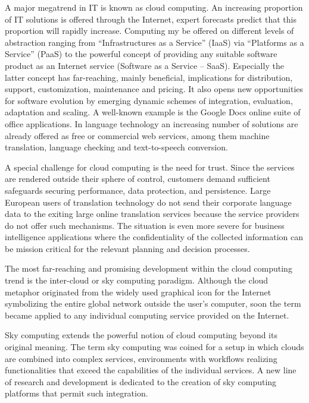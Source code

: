 \documentclass[10pt, plain]{../../metanetpaper}
\begin{document}
\begin{multicols}{2}
A major megatrend in IT is known as cloud computing.  An increasing proportion of IT solutions is offered through the Internet, expert forecasts predict that this proportion will rapidly increase.  Computing my be offered on different levels of abstraction ranging from “Infrastructures as a Service” (IaaS) via “Platforms as a Service” (PaaS) to the powerful concept of providing any suitable software product as an Internet service (Software as a Service – SaaS). Especially the latter concept has far-reaching, mainly beneficial, implications for distribution, support, customization, maintenance and pricing. It also opens new opportunities for software evolution by emerging dynamic schemes of integration, evaluation, adaptation and scaling. A well-known example is the Google Docs online suite of office applications. In language technology an increasing number of solutions are already offered as free or commercial web services, among them machine translation, language checking and text-to-speech conversion.

A special challenge for cloud computing is the need for trust. Since the services are rendered outside their sphere of control, customers demand sufficient safeguards securing performance, data protection, and persistence. Large European users of translation technology do not send their corporate language data to the exiting large online translation services because the service providers do not offer such mechanisms. The situation is even more severe for business intelligence applications where the confidentiality of the collected information can be mission critical for the relevant planning and decision processes.  

The most far-reaching and promising development within the cloud computing trend is the inter-cloud or sky computing paradigm.  Although the cloud metaphor originated from the widely used graphical icon for the Internet symbolizing the entire global network outside the user’s computer, soon the term became applied to any individual computing service provided on the Internet.  

Sky computing extends the powerful notion of cloud computing beyond its original meaning.  The term sky computing was coined for a setup in which clouds are combined into complex services, environments with workflows realizing functionalities that exceed the capabilities of the individual services.
A new line of research and development is dedicated to the creation of sky computing platforms that permit such integration. 


\end{multicols}
\end{document}
